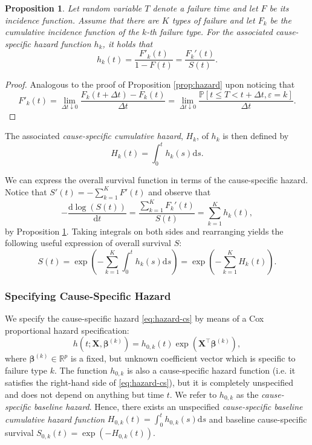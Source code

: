 \documentclass[11pt]{article}
\renewcommand{\P}{\mathbb{P}}
\newcommand{\R}{\mathbb{R}}
\newcommand{\X}{\mathbf{X}}
\renewcommand{\b}{\bm{\beta}}
\renewcommand{\d}{\text{d}}
\newtheorem{proposition}[theorem]{Proposition}
\begin{document}
\begin{proposition} \label{prop:hazard-cs}
	Let random variable $T$ denote a failure time and let $F$ be its incidence function. Assume that there are $K$ types of failure and let $F_k$ be the cumulative incidence function of the $k$-th failure type. For the associated cause-specific hazard function $h_k$, it holds that
	\[
		h_k(t) = \frac{F'_k(t)}{1 - F(t)} = \frac{F_k'(t)}{S(t)}.
	\]
\end{proposition}
\begin{proof}
	Analogous to the proof of Proposition \ref{prop:hazard} upon noticing that 
	\[
	F'_k(t) = \lim_{\Delta t \downarrow 0} \frac{ F_k(t + \Delta t) - F_k(t)}{\Delta t} = \lim_{\Delta t \downarrow 0} \frac{\P[ t\leq T < t + \Delta t, \varepsilon = k]}{\Delta t}.
	\]
\end{proof}
The associated \textit{cause-specific cumulative hazard}, $H_k$, of $h_k$ is then defined by 
\[
	H_k(t) = \int_0^t h_k (s) \d s.
\] 

We can express the overall survival function in terms of the cause-specific hazard. Notice that $S'(t) = -\sum_{k=1}^K F'(t)$ and observe that
\[
	- \frac{\d \log(S(t))}{\d t} = \frac{\sum_{k=1}^K F_k'(t)}{S(t)} = \sum_{k=1}^K h_k(t),
\]
by Proposition \ref{prop:hazard-cs}. Taking integrals on both sides and rearranging yields the following useful expression of overall survival $S$:
\[
	S(t) = \exp \left( - \sum_{k=1}^K \int_0^t h_k(s) \d s \right)
	=
	\exp\left( - \sum_{k=1}^K H_k(t) \right).
\]

\subsubsection{Specifying Cause-Specific Hazard}
We specify the cause-specific hazard \eqref{eq:hazard-cs} by means of a Cox proportional hazard specification:
\begin{equation} \label{eq:hazard-proportional-cs}
	h\left(t; \X, \b^{(k)}\right) = h_{0,k}(t) \exp\left( \X^\top \b^{(k)} \right),
\end{equation}
where $\b^{(k)}\in\R^p$ is a fixed, but unknown coefficient vector which is specific to failure type $k$. The function $h_{0,k}$ is also a cause-specific hazard function (i.e. it satisfies the right-hand side of \eqref{eq:hazard-cs}), but it is completely unspecified and does not depend on anything but time $t$. We refer to $h_{0,k}$ as the \textit{cause-specific baseline hazard}. Hence, there exists an unspecified \textit{cause-specific baseline cumulative hazard function} $H_{0,k}(t) = \int_0^t h_{0, k}(s) \d s$ and baseline cause-specific survival $S_{0,k}(t) = \exp(- H_{0,k}(t))$.
\end{document}
